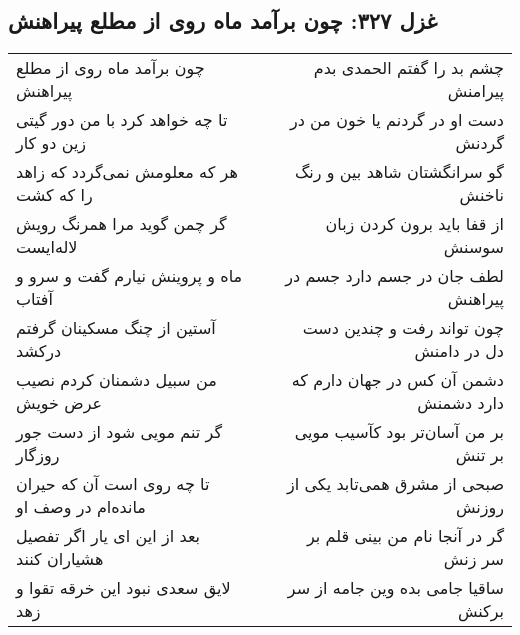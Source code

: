 \begin{center}
\section*{غزل ۳۲۷: چون برآمد ماه روی از مطلع پیراهنش}
\label{sec:327}
\begin{longtable}{l p{0.5cm} r}
چون برآمد ماه روی از مطلع پیراهنش
&&
چشم بد را گفتم الحمدی بدم پیرامنش
\\
تا چه خواهد کرد با من دور گیتی زین دو کار
&&
دست او در گردنم یا خون من در گردنش
\\
هر که معلومش نمی‌گردد که زاهد را که کشت
&&
گو سرانگشتان شاهد بین و رنگ ناخنش
\\
گر چمن گوید مرا همرنگ رویش لاله‌ایست
&&
از قفا باید برون کردن زبان سوسنش
\\
ماه و پروینش نیارم گفت و سرو و آفتاب
&&
لطف جان در جسم دارد جسم در پیراهنش
\\
آستین از چنگ مسکینان گرفتم درکشد
&&
چون تواند رفت و چندین دست دل در دامنش
\\
من سبیل دشمنان کردم نصیب عرض خویش
&&
دشمن آن کس در جهان دارم که دارد دشمنش
\\
گر تنم مویی شود از دست جور روزگار
&&
بر من آسان‌تر بود کآسیب مویی بر تنش
\\
تا چه روی است آن که حیران مانده‌ام در وصف او
&&
صبحی از مشرق همی‌تابد یکی از روزنش
\\
بعد از این ای یار اگر تفصیل هشیاران کنند
&&
گر در آنجا نام من بینی قلم بر سر زنش
\\
لایق سعدی نبود این خرقه تقوا و زهد
&&
ساقیا جامی بده وین جامه از سر برکنش
\\
\end{longtable}
\end{center}
